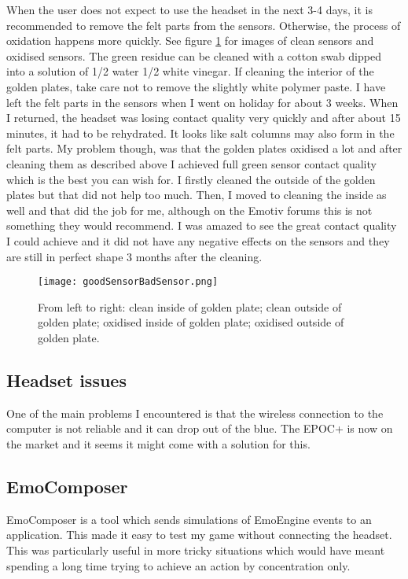 When the user does not expect to use the headset in the next 3-4 days, it is recommended to remove the felt parts from the sensors. Otherwise, the process of oxidation happens more quickly. See figure \ref{fig:cleanVsOxidised} for images of clean sensors and oxidised sensors. The green residue can be cleaned with a cotton swab dipped into a solution of 1/2 water 1/2 white vinegar. If cleaning the interior of the golden plates, take care not to remove the slightly white polymer paste. I have left the felt parts in the sensors when I went on holiday for about 3 weeks. When I returned, the headset was losing contact quality very quickly and after about 15 minutes, it had to be rehydrated. It looks like salt columns may also form in the felt parts. My problem though, was that the golden plates oxidised a lot and after cleaning them as described above I achieved full green sensor contact quality which is the best you can wish for. I firstly cleaned the outside of the golden plates but that did not help too much. Then, I moved to cleaning the inside as well and that did the job for me, although on the Emotiv forums this is not something they would recommend. I was amazed to see the great contact quality I could achieve and it did not have any negative effects on the sensors and they are still in perfect shape 3 months after the cleaning.

\begin{figure}
  \centering
  \texttt{[image: goodSensorBadSensor.png]}
  \caption{From left to right: clean inside of golden plate; clean outside of golden plate; oxidised inside of golden plate; oxidised outside of golden plate.}
    \label{fig:cleanVsOxidised}           
\end{figure}

\subsection{Headset issues}
One of the main problems I encountered is that the wireless connection to the computer is not reliable and it can drop out of the blue. The EPOC+ is now on the market and it seems it might come with a solution for this.

\subsection{EmoComposer}
EmoComposer is a tool which sends simulations of EmoEngine events to an application. This made it easy to test my game without connecting the headset. This was particularly useful in more tricky situations which would have meant spending a long time trying to achieve an action by concentration only.

